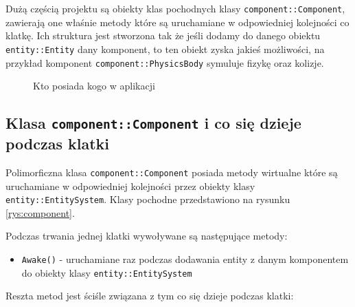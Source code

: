 \documentclass[a4paper,11pt]{article}
\begin{document}
Dużą częścią projektu są obiekty klas pochodnych klasy \texttt{component::Component}, zawierają one właśnie metody które są uruchamiane w odpowiedniej kolejności co klatkę. Ich struktura jest stworzona tak że jeśli dodamy do danego obiektu \texttt{entity::Entity} dany komponent, to ten obiekt zyska jakieś możliwości, na przykład komponent \texttt{component::PhysicsBody} symuluje fizykę oraz kolizje.
\begin{figure}
    \resizebox{\textwidth}{!}{%
    }
    \centering
    \caption{Kto posiada kogo w aplikacji}\label{rys:owners}
\end{figure}

\subsection{Klasa \texttt{component::Component} i co się dzieje podczas klatki}

Polimorficzna klasa \texttt{component::Component} posiada metody wirtualne które są uruchamiane w odpowiedniej kolejności przez obiekty klasy \texttt{entity::EntitySystem}. Klasy pochodne przedstawiono na rysunku \ref{rys:component}.

Podczas trwania jednej klatki wywoływane są następujące metody:

\begin{itemize}
    \item \texttt{Awake()} - uruchamiane raz podczas dodawania entity z danym komponentem do obiekty klasy \texttt{entity::EntitySystem}
\end{itemize}

Reszta metod jest ściśle związana z tym co się dzieje podczas klatki:
\end{document}
